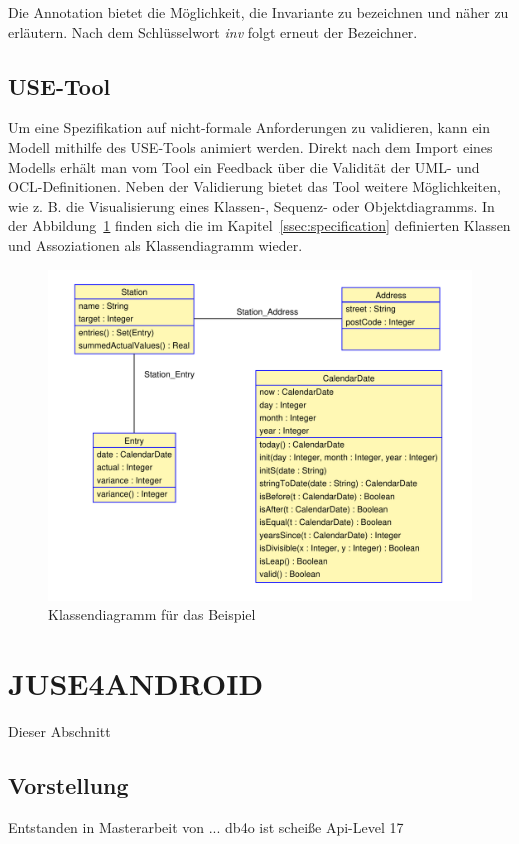 \documentclass[a4paper,twoside]{article}
\begin{document}
Die Annotation bietet die Möglichkeit, die Invariante zu bezeichnen und näher zu erläutern. Nach dem Schlüsselwort \textit{inv} folgt erneut der Bezeichner. 
\subsection{USE-Tool}

Um eine Spezifikation auf nicht-formale Anforderungen zu validieren, kann ein Modell mithilfe des USE-Tools animiert werden. Direkt nach dem Import eines Modells erhält man vom Tool ein Feedback über die Validität der UML- und OCL-Definitionen. Neben der Validierung bietet das Tool weitere Möglichkeiten, wie z. B. die Visualisierung eines Klassen-, Sequenz- oder Objektdiagramms. In der Abbildung~\ref{fig:Grafik2} finden sich die im Kapitel~\ref{ssec:specification} definierten Klassen und Assoziationen als Klassendiagramm wieder.

\begin{figure}[!h]
	\includegraphics[scale=.4]{pics/USE_class_diagramm.pdf}
	\caption{Klassendiagramm für das Beispiel}
	\label{fig:Grafik2}
\end{figure}


\section{\uppercase{JUSE4Android}}
Dieser Abschnitt 

\subsection{Vorstellung}
Entstanden in Masterarbeit von ... 
db4o ist scheiße
Api-Level 17
\end{document}
